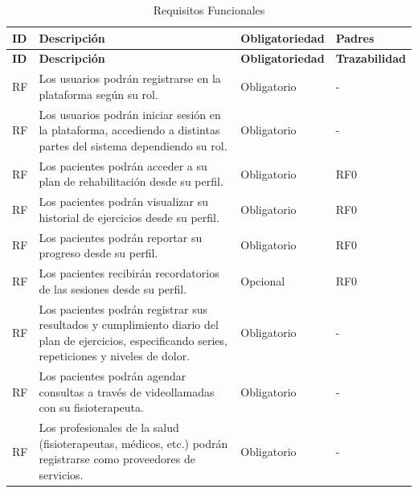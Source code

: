 \documentclass{article}
\begin{document}
\begin{longtable}{@{} p{2.5cm} p{6.5cm} p{3cm} p{3cm} @{}}
	\caption{Requisitos Funcionales}\\
	\toprule
	\textbf{ID} & \textbf{Descripción} & \textbf{Obligatoriedad} & \textbf{Padres} \\
	\midrule
	\endfirsthead
	
	\toprule
	\textbf{ID} & \textbf{Descripción} & \textbf{Obligatoriedad} & \textbf{Trazabilidad} \\
	\midrule
	\endhead
	
	\addlinespace
	RF\therequisitosFuncionales & Los usuarios podrán registrarse en la plataforma según su rol. & Obligatorio & - \\
	\addlinespace \stepcounter{requisitosFuncionales}
	RF\therequisitosFuncionales & Los usuarios podrán iniciar sesión en la plataforma, accediendo a distintas partes del sistema dependiendo su rol. & Obligatorio & - \\  
	\addlinespace \stepcounter{requisitosFuncionales}
	RF\therequisitosFuncionales & Los pacientes podrán acceder a su plan de rehabilitación desde su perfil. & Obligatorio & RF0\\ 
	\addlinespace \stepcounter{requisitosFuncionales}
	RF\therequisitosFuncionales & Los pacientes podrán visualizar su historial de ejercicios desde su perfil. & Obligatorio & RF0 \\ 
	\addlinespace \stepcounter{requisitosFuncionales}
	RF\therequisitosFuncionales & Los pacientes podrán reportar su progreso desde su perfil. & Obligatorio & RF0 \\ 
	\addlinespace \stepcounter{requisitosFuncionales}
	RF\therequisitosFuncionales & Los pacientes recibirán recordatorios de las sesiones desde su perfil. & Opcional & RF0 \\
	\addlinespace \stepcounter{requisitosFuncionales}
	RF\therequisitosFuncionales & Los pacientes podrán registrar sus resultados y cumplimiento diario del plan de ejercicios, especificando series, repeticiones y niveles de dolor. & Obligatorio & - \\ 
	RF\therequisitosFuncionales & Los pacientes podrán agendar consultas a través de videollamadas con su fisioterapeuta. & Obligatorio & - \\
	\addlinespace \stepcounter{requisitosFuncionales}
	RF\therequisitosFuncionales & Los profesionales de la salud (fisioterapeutas, médicos, etc.) podrán registrarse como proveedores de servicios. & Obligatorio & - \\ 

\end{longtable}
\end{document}
